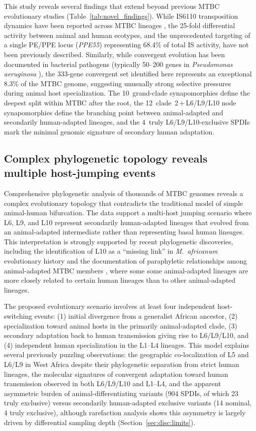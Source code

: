 \documentclass[11pt,a4paper]{article}
\begin{document}
This study reveals several findings that extend beyond previous MTBC evolutionary
studies (Table~\ref{tab:novel_findings}). While IS6110 transposition dynamics have been reported across MTBC
lineages \cite{Gonzalo2018}, the 25-fold differential activity between animal
and human ecotypes, and the unprecedented targeting of a single PE/PPE locus
(\textit{PPE55}) representing 68.4\% of total IS activity, have not been
previously described. Similarly, while convergent evolution has been documented
in bacterial pathogens (typically 50--200 genes in \textit{Pseudomonas aeruginosa}
\cite{Marvig2015}), the 333-gene convergent set identified here represents an
exceptional 8.3\% of the MTBC genome, suggesting unusually strong selective
pressures during animal host specialization. The 10~grand-clade synapomorphies define the deepest split within MTBC
after the root, the 12~clade~2\,+\,L6/L9/L10 node synapomorphies define
the branching point between animal-adapted and secondarily human-adapted
lineages, and the 4~truly L6/L9/L10-exclusive SPDIs mark the minimal
genomic signature of secondary human adaptation.

\subsection{Complex phylogenetic topology reveals multiple host-jumping events}
\label{sec:disc:complex_phylogeny}

Comprehensive phylogenetic analysis of thousands of MTBC genomes reveals a
complex evolutionary topology that contradicts the traditional model of simple
animal-human bifurcation. The data support a multi-host jumping scenario
where L6, L9, and L10 represent secondarily human-adapted lineages that evolved
from an animal-adapted intermediate rather than representing basal human lineages.
%
This interpretation is strongly supported by recent phylogenetic discoveries,
including the identification of L10 as a ``missing link'' in \textit{M.~africanum}
evolutionary history \cite{Guyeux2024L10} and the documentation of paraphyletic
relationships among animal-adapted MTBC members \cite{Brites2018}, where some
some animal-adapted lineages are more closely related to certain human lineages than to
other animal-adapted lineages.

The proposed evolutionary scenario involves at least four independent
host-switching events: (1) initial divergence from a generalist African
ancestor, (2) specialization toward animal hosts in the primarily
animal-adapted clade, (3) secondary adaptation back to human transmission
giving rise to L6/L9/L10, and (4) independent human specialization in the
L1--L4 lineages. This model explains several previously puzzling observations:
the geographic co-localization of L5 and L6/L9 in West Africa despite their
phylogenetic separation from strict human lineages, the molecular signatures
of convergent adaptation toward human transmission observed in both L6/L9/L10
and L1--L4, and the apparent asymmetric burden of animal-differentiating variants
(904 SPDIs, of which 23 truly exclusive) versus secondarily human-adapted
exclusive variants (14 nominal, 4 truly exclusive), although rarefaction
analysis shows this
asymmetry is largely driven by differential sampling depth
(Section~\ref{sec:disc:limits}).
\end{document}
